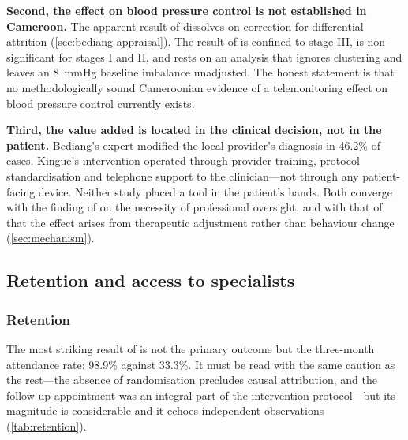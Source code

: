 \documentclass[12pt,a4paper,oneside]{report}
\begin{document}
\textbf{Second, the effect on blood pressure control is not established in Cameroon.} The apparent result of \textcite{bediang2021} dissolves on correction for differential attrition (\cref{sec:bediang-appraisal}). The result of \textcite{kingue2013} is confined to stage III, is non-significant for stages I and II, and rests on an analysis that ignores clustering and leaves an 8~mmHg baseline imbalance unadjusted. The honest statement is that no methodologically sound Cameroonian evidence of a telemonitoring effect on blood pressure control currently exists.

\textbf{Third, the value added is located in the clinical decision, not in the patient.} Bediang's expert modified the local provider's diagnosis in 46.2\% of cases. Kingue's intervention operated through provider training, protocol standardisation and telephone support to the clinician---not through any patient-facing device. Neither study placed a tool in the patient's hands. Both converge with the finding of \textcite{mao2020} on the necessity of professional oversight, and with that of \textcite{mihevc2025} that the effect arises from therapeutic adjustment rather than behaviour change (\cref{sec:mechanism}).

\subsection{Retention and access to specialists}\label{sec:retention-access}

\subsubsection{Retention}

The most striking result of \textcite{bediang2021} is not the primary outcome but the three-month attendance rate: 98.9\% against 33.3\%. It must be read with the same caution as the rest---the absence of randomisation precludes causal attribution, and the follow-up appointment was an integral part of the intervention protocol---but its magnitude is considerable and it echoes independent observations (\cref{tab:retention}).
\end{document}
